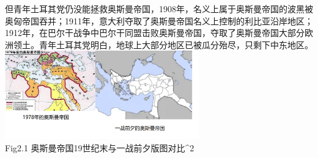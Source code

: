 \documentclass{article}
\begin{document}
但青年土耳其党仍没能拯救奥斯曼帝国，1908年，名义上属于奥斯曼帝国的波黑被奥匈帝国吞并；1911年，意大利夺取了奥斯曼帝国名义上控制的利比亚沿岸地区；1912年，在巴尔干战争中巴尔干同盟击败奥斯曼帝国，夺取了奥斯曼帝国大部分欧洲领土。青年土耳其党明白，地球上大部分地区已被瓜分殆尽，只剩下中东地区。\\
\centering\includegraphics[width=8.4cm]{em.png}\\
\centering {} Fig2.1 奥斯曼帝国19世纪末与一战前夕版图对比^2
\clearpage
\end{document}
